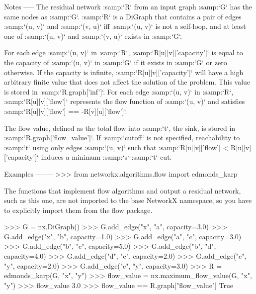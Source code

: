 \begin{DoxyVerb}
Notes
-----
The residual network :samp:`R` from an input graph :samp:`G` has the
same nodes as :samp:`G`. :samp:`R` is a DiGraph that contains a pair
of edges :samp:`(u, v)` and :samp:`(v, u)` iff :samp:`(u, v)` is not a
self-loop, and at least one of :samp:`(u, v)` and :samp:`(v, u)` exists
in :samp:`G`.

For each edge :samp:`(u, v)` in :samp:`R`, :samp:`R[u][v]['capacity']`
is equal to the capacity of :samp:`(u, v)` in :samp:`G` if it exists
in :samp:`G` or zero otherwise. If the capacity is infinite,
:samp:`R[u][v]['capacity']` will have a high arbitrary finite value
that does not affect the solution of the problem. This value is stored in
:samp:`R.graph['inf']`. For each edge :samp:`(u, v)` in :samp:`R`,
:samp:`R[u][v]['flow']` represents the flow function of :samp:`(u, v)` and
satisfies :samp:`R[u][v]['flow'] == -R[v][u]['flow']`.

The flow value, defined as the total flow into :samp:`t`, the sink, is
stored in :samp:`R.graph['flow_value']`. If :samp:`cutoff` is not
specified, reachability to :samp:`t` using only edges :samp:`(u, v)` such
that :samp:`R[u][v]['flow'] < R[u][v]['capacity']` induces a minimum
:samp:`s`-:samp:`t` cut.

Examples
--------
>>> from networkx.algorithms.flow import edmonds_karp

The functions that implement flow algorithms and output a residual
network, such as this one, are not imported to the base NetworkX
namespace, so you have to explicitly import them from the flow package.

>>> G = nx.DiGraph()
>>> G.add_edge("x", "a", capacity=3.0)
>>> G.add_edge("x", "b", capacity=1.0)
>>> G.add_edge("a", "c", capacity=3.0)
>>> G.add_edge("b", "c", capacity=5.0)
>>> G.add_edge("b", "d", capacity=4.0)
>>> G.add_edge("d", "e", capacity=2.0)
>>> G.add_edge("c", "y", capacity=2.0)
>>> G.add_edge("e", "y", capacity=3.0)
>>> R = edmonds_karp(G, "x", "y")
>>> flow_value = nx.maximum_flow_value(G, "x", "y")
>>> flow_value
3.0
>>> flow_value == R.graph["flow_value"]
True\end{DoxyVerb}
 \mbox{\label{namespacenetworkx_1_1algorithms_1_1flow_1_1edmondskarp_a8ad535e6f5f7ff7e85af78afcb1e9c6e}} 
